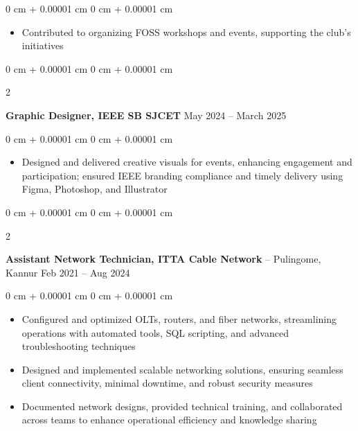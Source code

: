 \documentclass[10pt, letterpaper]{article}
\newenvironment{highlights}{
    \begin{itemize}[
        topsep=0.10 cm,
        parsep=0.10 cm,
        partopsep=0pt,
        itemsep=0pt,
        leftmargin=0 cm + 10pt
    ]
}{
    \end{itemize}
} %
\newenvironment{onecolentry}{
    \begin{adjustwidth}{
        0 cm + 0.00001 cm
    }{
        0 cm + 0.00001 cm
    }
}{
    \end{adjustwidth}
} %
\newenvironment{twocolentry}[2][]{
    \onecolentry
    \def\secondColumn{#2}
    \setcolumnwidth{\fill, 4.5 cm}
    \begin{paracol}{2}
}{
    \switchcolumn \raggedleft \secondColumn
    \end{paracol}
    \endonecolentry
} %
\begin{document}
        \vspace{0.10 cm}
        \begin{onecolentry}
            \begin{highlights}
                \item Contributed to organizing FOSS workshops and events, supporting the club's initiatives
            \end{highlights}
        \end{onecolentry}


        \vspace{0.2 cm}
        
        \begin{twocolentry}{
            May 2024 – March 2025
        }
            \textbf{Graphic Designer, IEEE SB SJCET}\end{twocolentry}

        \vspace{0.10 cm}
        \begin{onecolentry}
            \begin{highlights}
                \item Designed and delivered creative visuals for events, enhancing engagement and participation; ensured IEEE branding compliance and timely delivery using Figma, Photoshop, and Illustrator
            \end{highlights}
        \end{onecolentry}


        \vspace{0.2 cm}

        \begin{twocolentry}{
            Feb 2021 – Aug 2024
        }
            \textbf{Assistant Network Technician, ITTA Cable Network} -- Pulingome, Kannur\end{twocolentry}

        \vspace{0.10 cm}
        \begin{onecolentry}
            \begin{highlights}
                \item Configured and optimized OLTs, routers, and fiber networks, streamlining operations with automated tools, SQL scripting, and advanced troubleshooting techniques
                \item Designed and implemented scalable networking solutions, ensuring seamless client connectivity, minimal downtime, and robust security measures
                \item Documented network designs, provided technical training, and collaborated across teams to enhance operational efficiency and knowledge sharing
            \end{highlights}
        \end{onecolentry}
\end{document}
